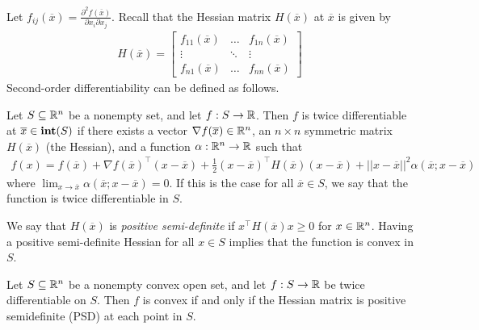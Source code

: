 Let $f_{ij}(\overline{x}) = \frac{\partial^2f(\overline{x})}{\partial x_i\partial x_j }$. Recall that the Hessian matrix  $H(\overline{x})$ at $\overline{x}$ is given by
%
\begin{align*}H(\overline{x}) = 
	\begin{bmatrix}
	f_{11}(\overline{x}) & \dots & f_{1n}(\overline{x})\\
	\vdots & \ddots & \vdots\\
	f_{n1}(\overline{x}) & \dots & f_{nn}(\overline{x})
	\end{bmatrix}
\end{align*}
%
Second-order differentiability can be defined as follows.
%
\begin{definition}
	Let $S \subseteq \mathbb{R}^n$ be a nonempty set, and let $f:S \to \mathbb{R}$. Then $f$ is twice differentiable at $\overline{x} \in \mathop{\bf int}(S)$ if there exists a vector $\nabla f(\overline{x})\in \mathbb{R}^n$, an $n \times n$ symmetric matrix $H(\overline{x})$ (the Hessian), and a function $\alpha: \mathbb{R}^n \to \mathbb{R}$ such that 
	\begin{align*}
	f(x) = f(\overline{x}) + \nabla f(\overline{x})^\top(x - \overline{x}) + 
	\frac{1}{2}(x - \overline{x})^\top H(\overline{x})(x - \overline{x}) + 
	||x-\overline{x}||^2\alpha(\overline{x};x-\overline{x})
	\end{align*}
	where $\lim_{x \to \overline{x}}\alpha(\overline{x}; x - \overline{x})=0$. If this is the case for all $\overline{x} \in S$, we say that the function is twice differentiable in $S$.
\end{definition}
%
We say that $H(\overline{x})$ is \emph{positive semi-definite} if $x^\top H(\overline{x})x \geq 0$ for $x \in \mathbb{R}^n$. Having a positive semi-definite Hessian for all $x \in S$ implies that the function is convex in $S$. 
%
\begin{theorem}
	Let $S \subseteq \mathbb{R}^n$ be a nonempty convex open set, and let $f:S \to \mathbb{R}$ be twice differentiable on $S$.\hspace{-4pt} Then\hspace{-1pt} $f$\hspace{-1pt} is convex if and only if the Hessian matrix is positive semidefinite (PSD) at each point in $S$.
\end{theorem}
%
